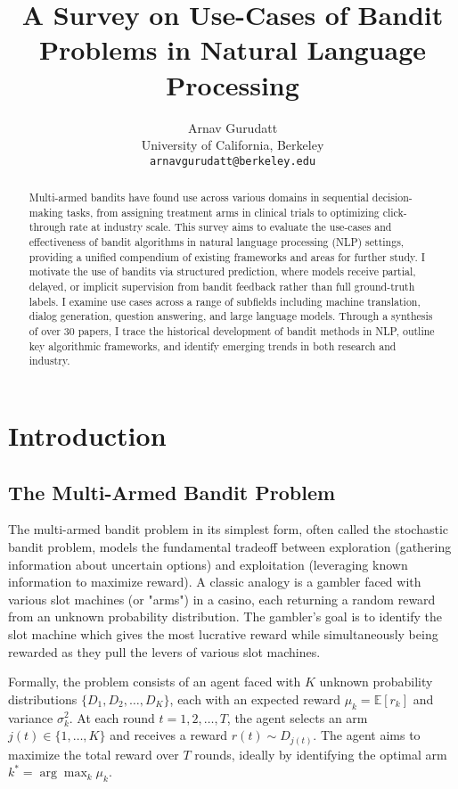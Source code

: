 \documentclass[11pt]{article}
\title{A Survey on Use-Cases of Bandit Problems in Natural Language Processing}
\author{Arnav Gurudatt \\
  University of California, Berkeley \\
  \texttt{arnavgurudatt@berkeley.edu}}
\begin{document}
\maketitle
\begin{abstract}
Multi-armed bandits have found use across various domains in sequential decision-making tasks, from assigning treatment arms in clinical trials to optimizing click-through rate at industry scale. This survey aims to evaluate the use-cases and effectiveness of bandit algorithms in natural language processing (NLP) settings, providing a unified compendium of existing frameworks and areas for further study. I motivate the use of bandits via structured prediction, where models receive partial, delayed, or implicit supervision from bandit feedback rather than full ground-truth labels. I examine use cases across a range of subfields including machine translation, dialog generation, question answering, and large language models. Through a synthesis of over 30 papers, I trace the historical development of bandit methods in NLP, outline key algorithmic frameworks, and identify emerging trends in both research and industry.
\end{abstract}

\section{Introduction}

\subsection*{The Multi-Armed Bandit Problem}

The multi-armed bandit problem in its simplest form, often called the stochastic bandit problem, models the fundamental tradeoff between exploration (gathering information about uncertain options) and exploitation (leveraging known information to maximize reward). A classic analogy is a gambler faced with various slot machines (or "arms") in a casino, each returning a random reward from an unknown probability distribution. The gambler’s goal is to identify the slot machine which gives the most lucrative reward while simultaneously being rewarded as they pull the levers of various slot machines.

Formally, the problem consists of an agent faced with $K$ unknown probability distributions $\{D_1, D_2, \dots, D_K\}$, each with an expected reward $\mu_k = \mathbb{E}[r_k]$ and variance $\sigma_k^2$. At each round $t = 1, 2, \dots, T$, the agent selects an arm $j(t) \in \{1, \dots, K\}$ and receives a reward $r(t) \sim D_{j(t)}$. The agent aims to maximize the total reward over $T$ rounds, ideally by identifying the optimal arm $k^* = \arg\max_k \mu_k$.
\end{document}
